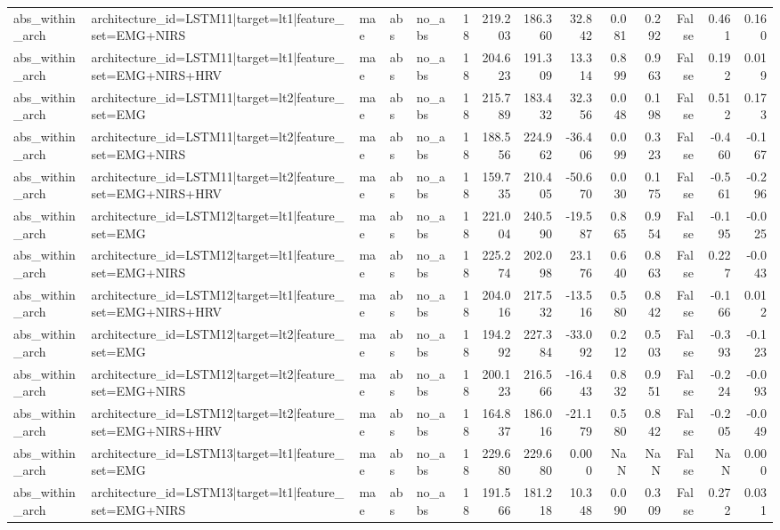 \begin{table}
\begin{tabular}{lllllrrrrrrrrr}
abs_within_arch & architecture_id=LSTM11|target=lt1|feature_set=EMG+NIRS & mae & abs & no_abs & 18 & 219.203 & 186.360 & 32.842 & 0.081 & 0.292 & False & 0.461 & 0.160 \\
abs_within_arch & architecture_id=LSTM11|target=lt1|feature_set=EMG+NIRS+HRV & mae & abs & no_abs & 18 & 204.623 & 191.309 & 13.314 & 0.899 & 0.963 & False & 0.192 & 0.019 \\
abs_within_arch & architecture_id=LSTM11|target=lt2|feature_set=EMG & mae & abs & no_abs & 18 & 215.789 & 183.432 & 32.356 & 0.048 & 0.198 & False & 0.512 & 0.173 \\
abs_within_arch & architecture_id=LSTM11|target=lt2|feature_set=EMG+NIRS & mae & abs & no_abs & 18 & 188.556 & 224.962 & -36.406 & 0.099 & 0.323 & False & -0.460 & -0.167 \\
abs_within_arch & architecture_id=LSTM11|target=lt2|feature_set=EMG+NIRS+HRV & mae & abs & no_abs & 18 & 159.735 & 210.405 & -50.670 & 0.030 & 0.175 & False & -0.561 & -0.296 \\
abs_within_arch & architecture_id=LSTM12|target=lt1|feature_set=EMG & mae & abs & no_abs & 18 & 221.004 & 240.590 & -19.587 & 0.865 & 0.954 & False & -0.195 & -0.025 \\
abs_within_arch & architecture_id=LSTM12|target=lt1|feature_set=EMG+NIRS & mae & abs & no_abs & 18 & 225.274 & 202.098 & 23.176 & 0.640 & 0.863 & False & 0.227 & -0.043 \\
abs_within_arch & architecture_id=LSTM12|target=lt1|feature_set=EMG+NIRS+HRV & mae & abs & no_abs & 18 & 204.016 & 217.532 & -13.516 & 0.580 & 0.842 & False & -0.166 & 0.012 \\
abs_within_arch & architecture_id=LSTM12|target=lt2|feature_set=EMG & mae & abs & no_abs & 18 & 194.292 & 227.384 & -33.092 & 0.212 & 0.503 & False & -0.393 & -0.123 \\
abs_within_arch & architecture_id=LSTM12|target=lt2|feature_set=EMG+NIRS & mae & abs & no_abs & 18 & 200.123 & 216.566 & -16.443 & 0.832 & 0.951 & False & -0.224 & -0.093 \\
abs_within_arch & architecture_id=LSTM12|target=lt2|feature_set=EMG+NIRS+HRV & mae & abs & no_abs & 18 & 164.837 & 186.016 & -21.179 & 0.580 & 0.842 & False & -0.205 & -0.049 \\
abs_within_arch & architecture_id=LSTM13|target=lt1|feature_set=EMG & mae & abs & no_abs & 18 & 229.680 & 229.680 & 0.000 & NaN & NaN & False & NaN & 0.000 \\
abs_within_arch & architecture_id=LSTM13|target=lt1|feature_set=EMG+NIRS & mae & abs & no_abs & 18 & 191.566 & 181.218 & 10.348 & 0.090 & 0.309 & False & 0.272 & 0.031 \\

\end{tabular}
\end{table}
